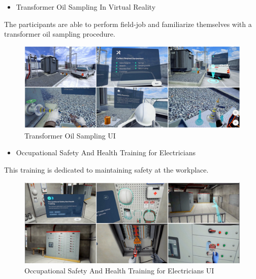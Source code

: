 \documentclass[]{report}
\begin{document}
\begin{itemize}
	\item Transformer Oil Sampling In Virtual Reality
\end{itemize}
The participants are able to perform field-job and familiarize themselves
with a transformer oil sampling procedure.
\begin{figure}[H]
	\includegraphics[scale=0.5]{ESTPEVR.png}
	\caption{Transformer Oil Sampling UI}
\end{figure}
\begin{itemize}
	\item Occupational Safety And Health Training for Electricians
\end{itemize}
This training is dedicated to maintaining safety at the workplace.
\begin{figure}[h]
	\begin{center} \includegraphics[scale=0.6]{ESTPEVR1.png}
	\caption{Occupational Safety And Health Training for Electricians UI}
	\end{center}
\end{figure}
\end{document}
